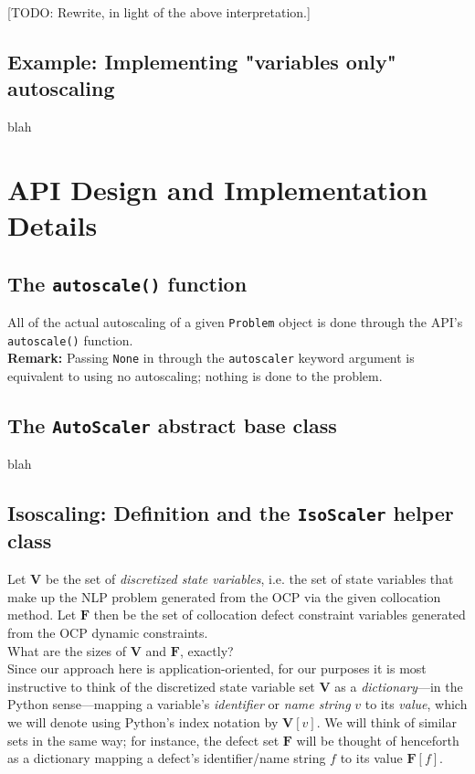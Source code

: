 \documentclass{article}
\theoremstyle{definition}
\begin{document}
[TODO: Rewrite, in light of the above interpretation.]

\subsection*{Example: Implementing "variables only" autoscaling}
blah

\section{API Design and Implementation Details}
\subsection*{The \texttt{autoscale()} function}

All of the actual autoscaling of a given \texttt{Problem} object is done through the API's \texttt{autoscale()} function. \\

\noindent
\textbf{Remark:} Passing \texttt{None} in through the \texttt{autoscaler} keyword argument is equivalent to using no autoscaling; nothing is done to the problem.

\subsection*{The \texttt{AutoScaler} abstract base class}
blah

\subsection*{Isoscaling: Definition and the \texttt{IsoScaler} helper class}
Let $\textbf{V}$ be the set of \textit{discretized state variables}, i.e. the set of state variables that make up the NLP problem generated from the OCP via the given collocation method. Let $\textbf{F}$ then be the set of collocation defect constraint variables generated from the OCP dynamic constraints. \\

\noindent
What are the sizes of $\textbf{V}$ and $\textbf{F}$, exactly? \\

\noindent
Since our approach here is application-oriented, for our purposes it is most instructive to think of the discretized state variable set $\textbf{V}$ as a \textit{dictionary}---in the Python sense---mapping a variable's \textit{identifier} or \textit{name string} $v$ to its \textit{value}, which we will denote using Python's index notation by $\textbf{V}[v]$. We will think of similar sets in the same way; for instance, the defect set $\textbf{F}$ will be thought of henceforth as a dictionary mapping a defect's identifier/name string $f$ to its value $\textbf{F}[f]$. \\
\end{document}
